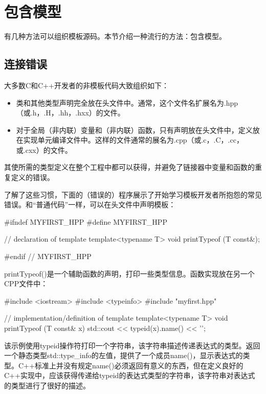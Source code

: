 \section{包含模型}


有几种方法可以组织模板源码。本节介绍一种流行的方法：包含模型。

\subsection{连接错误}

大多数C和C++开发者的非模板代码大致组织如下：

\begin{itemize}
\item
类和其他类型声明完全放在头文件中。通常，这个文件名扩展名为.hpp（或.h，.H，.hh，.hxx）的文件。

\item
对于全局（非内联）变量和（非内联）函数，只有声明放在头文件中，定义放在实现单元编译文件中。这样的文件通常的展名为.cpp（或.c，.C，.cc，或.cxx）的文件。
\end{itemize}

其使所需的类型定义在整个工程中都可以获得，并避免了链接器中变量和函数的重复定义的错误。

了解了这些习惯，下面的（错误的）程序展示了开始学习模板开发者所抱怨的常见错误。和“普通代码”一样，可以在头文件中声明模板：

\begin{cpp}
#ifndef MYFIRST_HPP
#define MYFIRST_HPP

// declaration of template
template<typename T>
void printTypeof (T const&);

#endif // MYFIRST_HPP
\end{cpp}

printTypeof()是一个辅助函数的声明，打印一些类型信息。函数实现放在另一个CPP文件中：

\begin{cpp}
#include <iostream>
#include <typeinfo>
#include "myfirst.hpp"

// implementation/definition of template
template<typename T>
void printTypeof (T const& x) {
	std::cout << typeid(x).name() << '\n';
}
\end{cpp}

该示例使用typeid操作符打印一个字符串，该字符串描述传递表达式的类型。返回一个静态类型std::type\_info的左值，提供了一个成员name()，显示表达式的类型。C++标准上并没有规定name()必须返回有意义的东西，但在定义良好的C++实现中，应该获得传递给typeid的表达式类型的字符串，该字符串对表达式的类型进行了很好的描述。
 
